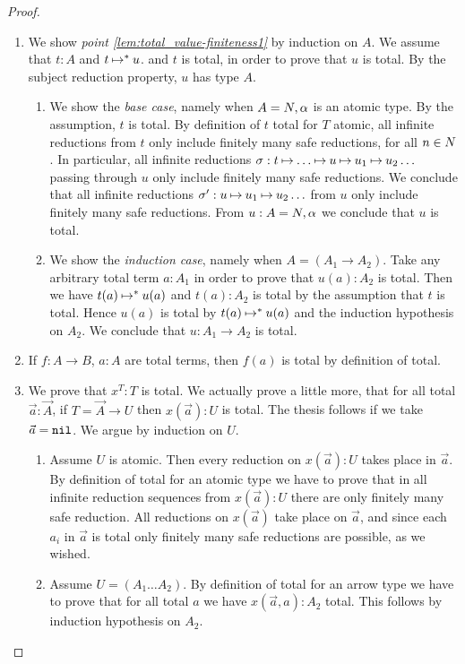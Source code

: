 \begin{proof}
\begin{enumerate}

\item
  We show \emph{point \ref{lem:total_value-finiteness1}}  by induction on $A$. 
  We assume that $t:A$ and $t \mathbin{\mapsto} ^*u$.
    and $t$ is total, in order to prove that $u$ is total.
 By the subject reduction property, $u$ has type $A$.
\begin{enumerate}
\item
  We show the \emph{base case}, namely when $A ={N},\alpha$ is an atomic type.
  By the assumption, $t$ is total.
  By definition of $t$ total for $T$ atomic, all infinite 
  reductions from $t$ only include finitely many safe reductions, for all $n \in {N}$.
  In particular, all infinite reductions $\sigma: t \mathbin{\mapsto} \ldots \mathbin{\mapsto} 
  u \mathbin{\mapsto} u_1 \mathbin{\mapsto} u_2 \ldots$ 
  passing through $u$ only include finitely many safe reductions. We conclude that
  all infinite reductions 
  $\sigma': u \mathbin{\mapsto} u_1 \mathbin{\mapsto} u_2 \ldots$  from $u$
  only include finitely many safe reductions. From $u:A ={N},\alpha$ we conclude that  $u$ is total.
\item
  We show the \emph{induction case}, namely when $A = (A_1\rightarrow A_2)$.
  Take any arbitrary total term $a:A_1$ in order to prove that $u(a):A_2$ is total. 
  Then we have $t(a) \mathbin{\mapsto}^* u(a)$ and 
  $t(a):A_2$ is total by the assumption that $t$ is total.
  Hence $u(a)$ is total by $t(a) \mathbin{\mapsto}^* u(a)$ and the induction hypothesis on $A_2$. 
  We conclude that $u:A_1\rightarrow A_2$ is total. 
\end{enumerate}

  \item
If $f:A \rightarrow B$, $a:A$ are total  terms, then $f(a)$  is total by definition of total.

\item
We prove that $x^T:T$ is total. 
We actually prove a little more, 
that for all total $\vec{a}:\vec{A}$, if $T = \vec{A} \rightarrow U$ then $x(\vec{a}):U$
is total. The thesis follows if we take $\vec{a} = {\tt nil}$. We argue by induction on $U$. 

\begin{enumerate}
\item
Assume $U$ is atomic. Then every reduction on $x(\vec{a}):U$
takes place in $\vec{a}$. By definition of total
for an atomic type we have to prove that in all infinite reduction sequences from $x(\vec{a}):U$ 
there are only finitely many safe reduction. All reductions on $x(\vec{a})$ take place on $\vec{a}$,
and since each $a_i$ in $\vec{a}$ is total only finitely many safe reductions are possible, as we wished.
\item
Assume $U = (A_1 \ldots A_2)$. By definition of total
for an arrow type we have to prove that for all total $a$ we have  $x(\vec{a},a):A_2$ total.
This follows by induction hypothesis on $A_2$.
\end{enumerate}


\end{enumerate}
\end{proof}
